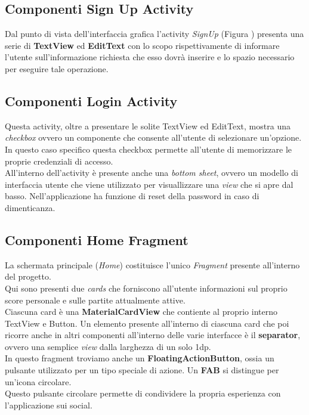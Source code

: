 \documentclass[a4paper,11pt,twoside,openright]{report}
\begin{document}
\subsection{Componenti Sign Up Activity}
Dal punto di vista dell'interfaccia grafica l'activity \textit{SignUp} (Figura ) presenta una serie di \textbf{TextView} ed \textbf{EditText} con lo scopo rispettivamente di informare l'utente sull'informazione richiesta che esso dovrà inserire e lo spazio necessario per eseguire tale operazione.

\subsection{Componenti Login Activity}
Questa activity, oltre a presentare le solite TextView ed EditText, mostra una \textit{checkbox} ovvero un componente che consente all'utente di selezionare un'opzione. In questo caso specifico  questa checkbox permette all'utente di memorizzare le proprie credenziali di accesso.\\
All'interno dell'activity è presente anche una \textit{bottom sheet}, ovvero un modello di interfaccia utente che viene utilizzato per visuallizzare una \textit{view} che si apre dal basso. Nell'applicazione ha funzione di reset della password in caso di dimenticanza.

\subsection{Componenti Home Fragment}
La schermata principale (\textit{Home}) costituisce l'unico \textit{Fragment} presente all'interno del progetto.\\
Qui sono presenti due \textit{cards} che forniscono all'utente informazioni sul proprio score personale e sulle partite attualmente attive.\\
Ciascuna card è una \textbf{MaterialCardView} che contiente al proprio interno TextView e Button. Un elemento presente all'interno di ciascuna card che poi ricorre anche in altri componenti all'interno delle varie interfacce è il \textbf{separator}, ovvero una semplice \textit{view} dalla larghezza di un solo 1dp.\\
In questo fragment troviamo anche un \textbf{FloatingActionButton}\cite{12}, ossia un pulsante utilizzato per un tipo speciale di azione. Un \textbf{FAB} si distingue per un'icona circolare.\\
Questo pulsante circolare permette di condividere la propria esperienza con l'applicazione sui social.\\
\end{document}
